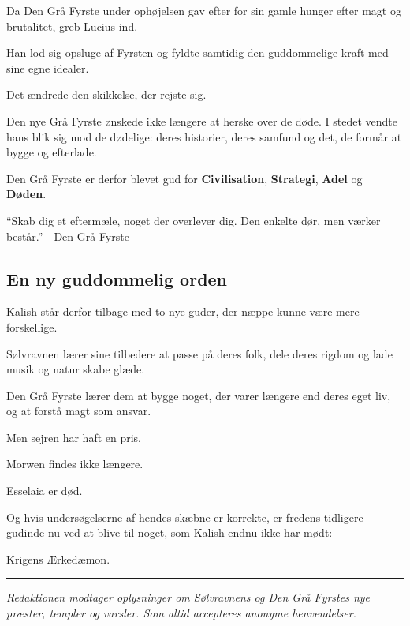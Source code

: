 \documentclass[a5paper,10pt,twoside,openany]{memoir}
\newenvironment{pullquote}
  {%
    \begin{tcolorbox}[
      enhanced,
      breakable
    ]
    \itshape
    \large
  }
  {%
    \end{tcolorbox}
  }
\newcommand{\separator}{%
  \par
  \noindent
  {\color{black!40}\rule{\textwidth}{0.4pt}}
  \par
}
\begin{document}
Da Den Grå Fyrste under ophøjelsen gav efter for sin gamle hunger efter magt og brutalitet, greb Lucius ind.

Han lod sig opsluge af Fyrsten og fyldte samtidig den guddommelige kraft med sine egne idealer.

Det ændrede den skikkelse, der rejste sig.

Den nye Grå Fyrste ønskede ikke længere at herske over de døde. I stedet vendte hans blik sig mod de dødelige: deres historier, deres samfund og det, de formår at bygge og efterlade.

Den Grå Fyrste er derfor blevet gud for \textbf{Civilisation}, \textbf{Strategi}, \textbf{Adel} og \textbf{Døden}.

\begin{pullquote}
``Skab dig et eftermæle, noget der overlever dig. Den enkelte dør, men værker består.''
- Den Grå Fyrste
\end{pullquote}

\subsection*{En ny guddommelig orden}

Kalish står derfor tilbage med to nye guder, der næppe kunne være mere forskellige.

Sølvravnen lærer sine tilbedere at passe på deres folk, dele deres rigdom og lade musik og natur skabe glæde.

Den Grå Fyrste lærer dem at bygge noget, der varer længere end deres eget liv, og at forstå magt som ansvar.

Men sejren har haft en pris.

Morwen findes ikke længere.

Esselaia er død.

Og hvis undersøgelserne af hendes skæbne er korrekte, er fredens tidligere gudinde nu ved at blive til noget, som Kalish endnu ikke har mødt:

Krigens Ærkedæmon.

\separator

\par\medskip

\textit{Redaktionen modtager oplysninger om Sølvravnens og Den Grå Fyrstes nye præster, templer og varsler. Som altid accepteres anonyme henvendelser.}


\end{document}

